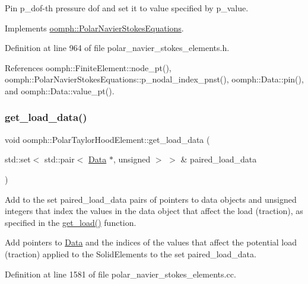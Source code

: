 Pin p\+\_\+dof-\/th pressure dof and set it to value specified by p\+\_\+value. 



Implements \hyperlink{classoomph_1_1PolarNavierStokesEquations_a80333b602104b12993c7d3b242d2adfb}{oomph\+::\+Polar\+Navier\+Stokes\+Equations}.



Definition at line 964 of file polar\+\_\+navier\+\_\+stokes\+\_\+elements.\+h.



References oomph\+::\+Finite\+Element\+::node\+\_\+pt(), oomph\+::\+Polar\+Navier\+Stokes\+Equations\+::p\+\_\+nodal\+\_\+index\+\_\+pnst(), oomph\+::\+Data\+::pin(), and oomph\+::\+Data\+::value\+\_\+pt().

\mbox{\label{classoomph_1_1PolarTaylorHoodElement_a0a432b5a93ca2e789992ec77d050f49a}} 
\subsubsection{\texorpdfstring{get\+\_\+load\+\_\+data()}{get\_load\_data()}}
{\footnotesize\ttfamily void oomph\+::\+Polar\+Taylor\+Hood\+Element\+::get\+\_\+load\+\_\+data (\begin{DoxyParamCaption}\item[{std\+::set$<$ std\+::pair$<$ \hyperlink{classoomph_1_1Data}{Data} $\ast$, unsigned $>$ $>$ \&}]{paired\+\_\+load\+\_\+data }\end{DoxyParamCaption})}



Add to the set paired\+\_\+load\+\_\+data pairs of pointers to data objects and unsigned integers that index the values in the data object that affect the load (traction), as specified in the \hyperlink{classoomph_1_1PolarNavierStokesEquations_a47ae24dc603a7d46bd4a85ccfb2b8e23}{get\+\_\+load()} function. 

Add pointers to \hyperlink{classoomph_1_1Data}{Data} and the indices of the values that affect the potential load (traction) applied to the Solid\+Elements to the set paired\+\_\+load\+\_\+data. 

Definition at line 1581 of file polar\+\_\+navier\+\_\+stokes\+\_\+elements.\+cc.



